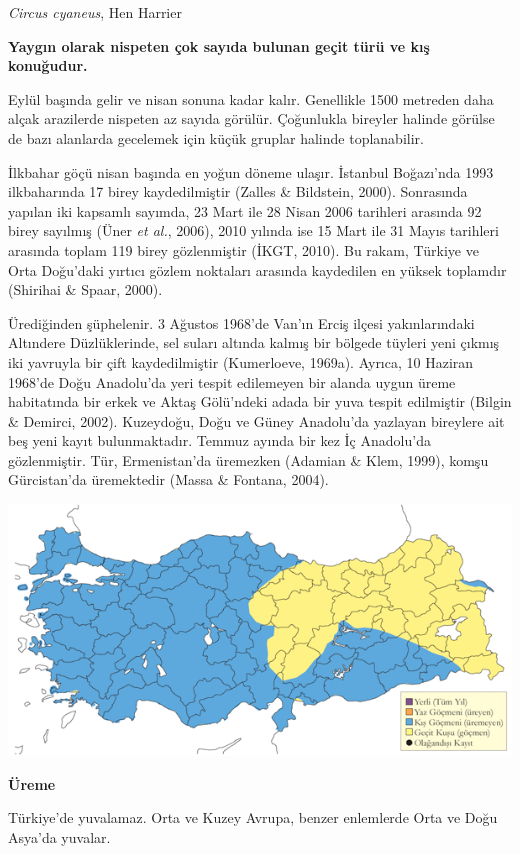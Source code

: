 \documentclass[
  a4paper,
  DIV=11,
  numbers=noendperiod]{scrreprt}
\begin{document}
\emph{Circus cyaneus}, Hen Harrier

\textbf{Yaygın olarak nispeten çok sayıda bulunan geçit türü ve kış
konuğudur.}

Eylül başında gelir ve nisan sonuna kadar kalır. Genellikle 1500
metreden daha alçak arazilerde nispeten az sayıda görülür. Çoğunlukla
bireyler halinde görülse de bazı alanlarda gecelemek için küçük gruplar
halinde toplanabilir.

İlkbahar göçü nisan başında en yoğun döneme ulaşır. İstanbul Boğazı'nda
1993 ilkbaharında 17 birey kaydedilmiştir (Zalles \& Bildstein, 2000).
Sonrasında yapılan iki kapsamlı sayımda, 23 Mart ile 28 Nisan 2006
tarihleri arasında 92 birey sayılmış (Üner \emph{et al.}, 2006), 2010
yılında ise 15 Mart ile 31 Mayıs tarihleri arasında toplam 119 birey
gözlenmiştir (İKGT, 2010). Bu rakam, Türkiye ve Orta Doğu'daki yırtıcı
gözlem noktaları arasında kaydedilen en yüksek toplamdır (Shirihai \&
Spaar, 2000).

Ürediğinden şüphelenir. 3 Ağustos 1968'de Van'ın Erciş ilçesi
yakınlarındaki Altındere Düzlüklerinde, sel suları altında kalmış bir
bölgede tüyleri yeni çıkmış iki yavruyla bir çift kaydedilmiştir
(Kumerloeve, 1969a). Ayrıca, 10 Haziran 1968'de Doğu Anadolu'da yeri
tespit edilemeyen bir alanda uygun üreme habitatında bir erkek ve Aktaş
Gölü'ndeki adada bir yuva tespit edilmiştir (Bilgin \& Demirci, 2002).
Kuzeydoğu, Doğu ve Güney Anadolu'da yazlayan bireylere ait beş yeni
kayıt bulunmaktadır. Temmuz ayında bir kez İç Anadolu'da gözlenmiştir.
Tür, Ermenistan'da üremezken (Adamian \& Klem, 1999), komşu Gürcistan'da
üremektedir (Massa \& Fontana, 2004).

\includegraphics{images/harita_Page_103.png}

\textbf{Üreme}

Türkiye'de yuvalamaz. Orta ve Kuzey Avrupa, benzer enlemlerde Orta ve
Doğu Asya'da yuvalar.
\end{document}
